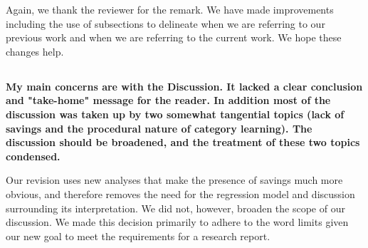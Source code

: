 \documentclass[10pt,a4paper]{article} \usepackage{amsmath} \usepackage{parskip}
\begin{document}
Again, we thank the reviewer for the remark. We have made improvements including
the use of subsections to delineate when we are referring to our previous work
and when we are referring to the current work. We hope these changes help.

\subsection{} \textbf{
  My main concerns are with the Discussion. It lacked a clear conclusion and
  "take-home" message for the reader. In addition most of the discussion was taken
  up by two somewhat tangential topics (lack of savings and the procedural nature
  of category learning). The discussion should be broadened, and the treatment of
  these two topics condensed.
}

Our revision uses new analyses that make the presence of savings much more
obvious, and therefore removes the need for the regression model and discussion
surrounding its interpretation. We did not, however, broaden the scope of our
discussion. We made this decision primarily to adhere to the word limits given
our new goal to meet the requirements for a research report.


\end{document}
